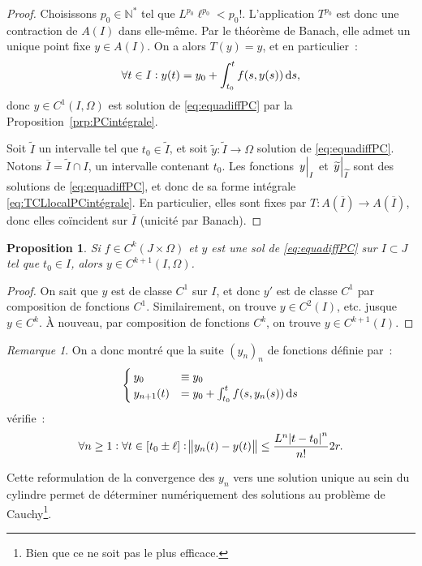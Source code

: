 \documentclass{report}
\newtheorem{prp}[thm]{Proposition}
\theoremstyle{definition}
\theoremstyle{remark}
\newtheorem*{rmq}{Remarque}
\numberwithin{equation}{section}
\newcommand{\N}{\mathbb N}
\newcommand{\Ns}{\N^{*}}
\newcommand{\restr}[2]{\left.#1\vphantom{\big|}\right|_{#2}}
\begin{document}
\begin{proof}
			Choisissons $p_0 \in \Ns$ tel que $L^{p_0}\ell^{p_0} < p_0!$. L'application $T^{p_0}$ est donc une contraction de $A(I)$ dans elle-même. Par le
			théorème de Banach, elle admet un unique point fixe $y \in A(I)$. On a alors $T(y) = y$, et en particulier~:
			\begin{align}\label{eq:TCLlocalPCintégrale}
				\forall t \in I : y(t) = y_0 + \int_{t_0}^tf(s, y(s))\dif s,
			\end{align}
			donc $y \in C^1(I, \Omega)$ est solution de \eqref{eq:equadiffPC} par la Proposition~\ref{prp:PCintégrale}.

			Soit $\widetilde I$ un intervalle tel que $t_0 \in \widetilde I$, et soit $\widetilde y : \widetilde I \to \Omega$ solution de \eqref{eq:equadiffPC}.
			Notons $\overline I = \widetilde I \cap I$, un intervalle contenant $t_0$. Les fonctions $\restr yI$ et $\restr {\widetilde y}{\widetilde I}$ sont des solutions
			de \eqref{eq:equadiffPC}, et donc de sa forme intégrale \eqref{eq:TCLlocalPCintégrale}. En particulier, elles sont fixes par
			$T : A(\overline I) \to A(\overline I)$, donc elles coïncident sur $\overline I$ (unicité par Banach).
			\end{proof}		

			\begin{prp} Si $f \in C^k(J \times \Omega)$ et $y$ est une sol de \eqref{eq:equadiffPC} sur $I \subset J$ tel que $t_0 \in I$, alors $y \in C^{k+1}(I, \Omega)$.
			\end{prp}

			\begin{proof} On sait que $y$ est de classe $C^1$ sur $I$, et donc $y'$ est de classe $C^1$ par composition de fonctions $C^1$. Similairement, on
			trouve $y \in C^2(I)$, etc. jusque $y \in C^k$. À nouveau, par composition de fonctions $C^k$, on trouve $y \in C^{k+1}(I)$.
			\end{proof}

			\begin{rmq} On a donc montré que la suite $(y_n)_n$ de fonctions définie par~:
			\begin{equation}
				\begin{cases}
				y_0 &\equiv y_0 \\
				y_{n+1}(t) &= y_0 + \int_{t_0}^tf(s, y_n(s))\dif s
			\end{cases}
			\end{equation}
			vérifie~:
			\begin{equation}
				\forall n \geq 1 : \forall t \in [t_0 \pm \ell] : \norm {y_n(t) - y(t)} \leq \frac {L^n\abs {t-t_0}^n}{n!}2r.
			\end{equation}

			Cette reformulation de la convergence des $y_n$  vers une solution unique au sein du cylindre permet de déterminer numériquement des solutions au
			problème de Cauchy\footnote{Bien que ce ne soit pas le plus efficace.}.
			\end{rmq}
\end{document}
